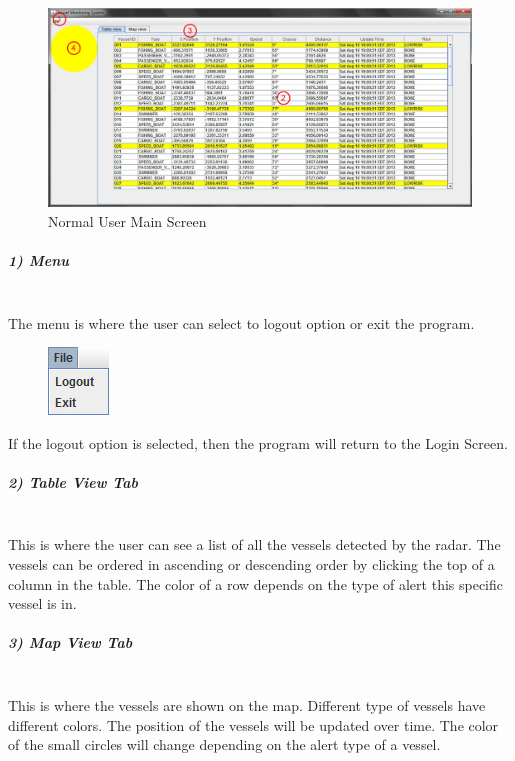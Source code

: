\documentclass{article}
\begin{document}
	\begin{figure}[!htb]
	\caption{Normal User Main Screen}
	\centering
	\includegraphics[scale=0.35]{images/userManual2_user.jpg}
	\end{figure}

\subparagraph{1) Menu \\ \\}

The menu is where the user can select to logout option or exit the program.
	\begin{figure}[!htb]
	\centering
	\includegraphics[scale=1]{images/userManual4.jpg}
	\end{figure}

If the logout option is selected, then the program will return to the Login Screen.\\

\subparagraph{2) Table View Tab \\ \\}
This is where the user can see a list of all the vessels detected by the radar. The vessels can be ordered in ascending or descending order by clicking the top of a column in the table. The color of a row depends on the type of alert this specific vessel is in.

\break
\subparagraph{3) Map View Tab \\ \\}
This is where the vessels are shown on the map. Different type of vessels have different colors. The position of the vessels will be updated over time. The color of the small circles will change depending on the alert type of a vessel.
	
\end{document}
